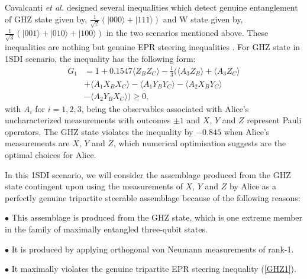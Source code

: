 \documentclass[reprint,superscriptaddress,nofootinbib,amsmath,amssymb,aps,pra,longbibliography]{revtex4-1}
\begin{document}
Cavalcanti \textit{et al.} designed several inequalities \cite{Cavalcanti15} which detect genuine entanglement of GHZ state given by, $\frac{1}{\sqrt{2}}(|000\rangle + |111 \rangle)$ and W state given by, $\frac{1}{\sqrt{3}}(|001\rangle + |010 \rangle + |100\rangle)$ in the two scenarios mentioned above. These inequalities are nothing but genuine EPR steering inequalities \cite{Cavalcanti15}. For GHZ state in 1SDI scenario, the inequality has the following form: 
\begin{align}
G_1 &= 1 + 0.1547 \langle Z_BZ_C\rangle - \frac{1}{3} ( \langle A_3Z_B \rangle + \langle A_3Z_C \rangle  \nonumber \\
& + \langle A_1X_BX_C\rangle - \langle A_1Y_BY_C\rangle - \langle A_2X_BY_C\rangle \nonumber \\
& - \langle A_2Y_BX_C\rangle )\geq 0,
\label{GHZ1}
\end{align}
with $A_i$ for $i=1, 2, 3$, being the observables associated with Alice's uncharacterized measurements with outcomes $\pm 1$ and $X$, $Y$ and $Z$ represent Pauli operators. The GHZ state violates the inequality by $-0.845$ when Alice's measurements are $X$, $Y$ and $Z$, which numerical optimisation suggests are the optimal choices for Alice. %

 In this 1SDI scenario, we will consider the assemblage produced from the GHZ state contingent upon using the measurements of $X$, $Y$ and $Z$ by Alice as a perfectly genuine tripartite steerable assemblage because of the following reasons:

$\bullet$ This assemblage is produced from the GHZ state, which is one extreme member in the family of maximally entangled three-qubit states.

$\bullet$ It is produced by applying orthogonal von Neumann measurements of rank-1.

$\bullet$ It maximally violates the genuine tripartite EPR steering inequality (\ref{GHZ1}).
\end{document}
